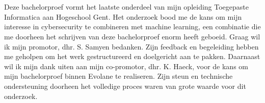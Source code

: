 
\chapter*{}%
\label{ch:voorwoord}

Deze bachelorproef vormt het laatste onderdeel van mijn opleiding Toegepaste Informatica aan Hogeschool Gent. Het onderzoek bood me de kans om mijn interesse in cybersecurity te combineren met machine learning, een combinatie die me doorheen het schrijven van deze bachelorproef enorm heeft geboeid.
Graag wil ik mijn promotor, dhr. S. Samyen bedanken. Zijn feedback en begeleiding hebben me geholpen om het werk gestructureerd en doelgericht aan te pakken. Daarnaast wil ik mijn dank uiten aan mijn co-promotor, dhr. K. Haeck, voor de kans om mijn bachelorproef binnen Evolane te realiseren. Zijn steun en technische ondersteuning doorheen het volledige proces waren van grote waarde voor dit onderzoek.


\lipsum[1-2]